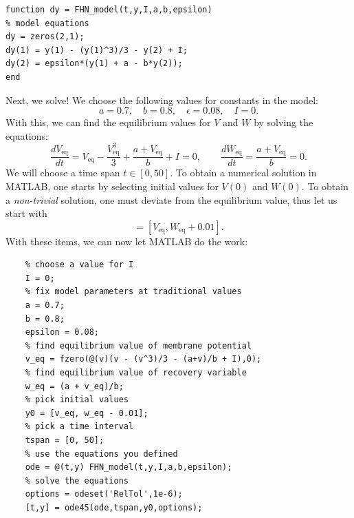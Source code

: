 \documentclass{book}
\theoremstyle{definition}
\newcommand{\f}[2]{\frac{#1}{#2}}
\begin{document}
\begin{framed}
\begin{verbatim}    
function dy = FHN_model(t,y,I,a,b,epsilon)
% model equations
dy = zeros(2,1);
dy(1) = y(1) - (y(1)^3)/3 - y(2) + I;
dy(2) = epsilon*(y(1) + a - b*y(2));
end
\end{verbatim}
\end{framed}


Next, we solve! We choose the following values for constants in the model: 
\begin{equation*}
a = 0.7, \quad b = 0.8, \quad \epsilon = 0.08, \quad I = 0.
\end{equation*}
With this, we can find the equilibrium values for $V$ and $W$ by solving the equations:
\begin{equation*}
\f{dV_{\mbox{eq}}}{dt} = V_{\mbox{eq}}- \f{V_{\mbox{eq}}^3}{3} + \f{a+V_{\mbox{eq}}}{b} + I = 0, \qquad
\f{dW_{\mbox{eq}}}{dt} = \f{a+ V_{\mbox{eq}}}{b} = 0.
\end{equation*}
We will choose a time span $t\in [0,50]$. To obtain a numerical solution in MATLAB, one starts by selecting initial values for $V(0)$ and $W(0)$. To obtain a \textit{non-trivial} solution, one must deviate from the equilibrium value, thus let us start with
\begin{equation*}
[V_{0}, W(0)] = [V_{\mbox{eq}}, W_{\mbox{eq}} + 0.01].
\end{equation*}
With these items, we can now let MATLAB do the work:
\begin{framed}
	\begin{verbatim}    
	% choose a value for I
	I = 0;
	% fix model parameters at traditional values
	a = 0.7;
	b = 0.8;
	epsilon = 0.08;
	% find equilibrium value of membrane potential
	v_eq = fzero(@(v)(v - (v^3)/3 - (a+v)/b + I),0);
	% find equilibrium value of recovery variable
	w_eq = (a + v_eq)/b;
	% pick initial values
	y0 = [v_eq, w_eq - 0.01];
	% pick a time interval
	tspan = [0, 50];
	% use the equations you defined
	ode = @(t,y) FHN_model(t,y,I,a,b,epsilon);
	% solve the equations
	options = odeset('RelTol',1e-6);
	[t,y] = ode45(ode,tspan,y0,options);
	\end{verbatim}
\end{framed}
\end{document}
